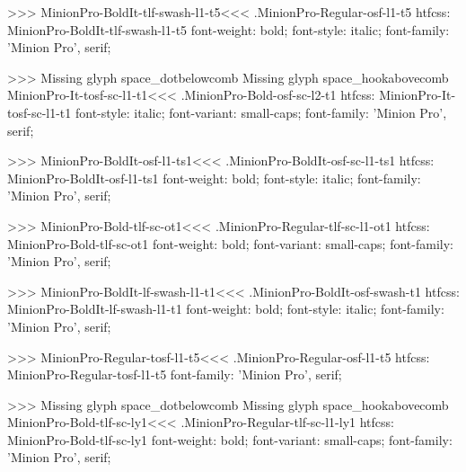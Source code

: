 {>>>
\<MinionPro-BoldIt-tlf-swash-l1-t5\><<<
.MinionPro-Regular-osf-l1-t5
htfcss:  MinionPro-BoldIt-tlf-swash-l1-t5  font-weight: bold; font-style: italic; font-family: 'Minion Pro', serif;

>>>
Missing glyph	space_dotbelowcomb
Missing glyph	space_hookabovecomb
\<MinionPro-It-tosf-sc-l1-t1\><<<
.MinionPro-Bold-osf-sc-l2-t1
htfcss:  MinionPro-It-tosf-sc-l1-t1  font-style: italic; font-variant: small-caps; font-family: 'Minion Pro', serif;

>>>
\<MinionPro-BoldIt-osf-l1-ts1\><<<
.MinionPro-BoldIt-osf-sc-l1-ts1
htfcss:  MinionPro-BoldIt-osf-l1-ts1  font-weight: bold; font-style: italic; font-family: 'Minion Pro', serif;

>>>
\<MinionPro-Bold-tlf-sc-ot1\><<<
.MinionPro-Regular-tlf-sc-l1-ot1
htfcss:  MinionPro-Bold-tlf-sc-ot1  font-weight: bold; font-variant: small-caps; font-family: 'Minion Pro', serif;

>>>
\<MinionPro-BoldIt-lf-swash-l1-t1\><<<
.MinionPro-BoldIt-osf-swash-t1
htfcss:  MinionPro-BoldIt-lf-swash-l1-t1  font-weight: bold; font-style: italic; font-family: 'Minion Pro', serif;

>>>
\<MinionPro-Regular-tosf-l1-t5\><<<
.MinionPro-Regular-osf-l1-t5
htfcss:  MinionPro-Regular-tosf-l1-t5  font-family: 'Minion Pro', serif;

>>>
Missing glyph	space_dotbelowcomb
Missing glyph	space_hookabovecomb
\<MinionPro-Bold-tlf-sc-ly1\><<<
.MinionPro-Regular-tlf-sc-l1-ly1
htfcss:  MinionPro-Bold-tlf-sc-ly1  font-weight: bold; font-variant: small-caps; font-family: 'Minion Pro', serif;

}
